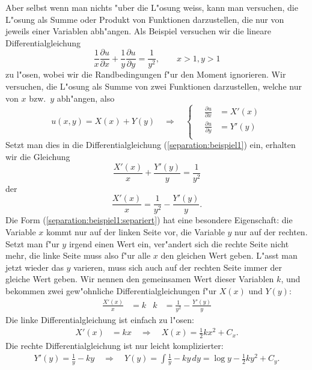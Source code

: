 Aber selbst wenn man nichts "uber die L"osung weiss, kann man 
versuchen, die L"osung als Summe oder Produkt von Funktionen darzustellen,
die nur von jeweils einer Variablen abh"angen. Als Beispiel versuchen
wir die lineare Differentialgleichung 
\begin{equation}
\frac1x
\frac{\partial u}{\partial x}
+
\frac1y
\frac{\partial u}{\partial y}
=\frac1{y^2}
,
\qquad x>1, y>1
\label{separation:beispiel1}
\end{equation}
zu l"osen, wobei wir die Randbedingungen f"ur den Moment ignorieren.
Wir versuchen, die L"osung als Summe von zwei Funktionen darzustellen,
welche nur von $x$ bzw.~$y$ abh"angen, also
\begin{equation}
u(x,y)=X(x)+Y(y)
\quad\Rightarrow\quad
\begin{cases}
\quad\frac{\partial u}{\partial x}&=X'(x)\\
\quad\frac{\partial u}{\partial y}&=Y'(y)\\
\end{cases}
\label{separation:beispiel1:ansatz}
\end{equation}
Setzt man dies in die Differentialgleichung (\ref{separation:beispiel1})
ein, erhalten wir die Gleichung
\[
\frac{X'(x)}{x}+\frac{Y'(y)}{y}=\frac1{y^2}
\]
der
\begin{equation}
\frac{X'(x)}{x}
=\frac1{y^2}
-\frac{Y'(y)}{y}.
\label{separation:beispiel1:separiert}
\end{equation}
Die Form (\ref{separation:beispiel1:separiert}) hat eine besondere
Eigenschaft: die Variable $x$ kommt nur auf der linken Seite vor,
die Variable $y$ nur auf der rechten. Setzt man f"ur $y$ irgend
einen Wert ein, ver"andert sich die rechte Seite nicht mehr,
die linke Seite muss also f"ur alle $x$ den gleichen Wert geben.
L"asst man jetzt wieder das $y$ varieren, muss sich auch auf der rechten
Seite immer der gleiche Wert geben. Wir nennen den gemeinsamen Wert
dieser Variablen $k$, und bekommen zwei gew"ohnliche Differentialgleichungen
f"ur $X(x)$ und $Y(y)$:
\begin{align}
\frac{X'(x)}{x}&=k
&
k&=\frac1{y^2}-\frac{Y'(y)}{y}
\label{separation:beispiel1:separiertedgl}
\end{align}
Die linke Differentialgleichung ist einfach zu l"osen:
\begin{align*}
X'(x)&=kx\quad\Rightarrow\quad X(x)=
\frac12kx^2+C_x.
\end{align*}
Die rechte Differentialgleichung ist nur leicht komplizierter:
\begin{align*}
Y'(y)=\frac1y-ky
\quad\Rightarrow\quad
Y(y)=\int\frac1y-ky\,dy=
\log y-\frac12ky^2+C_y.
\end{align*}
